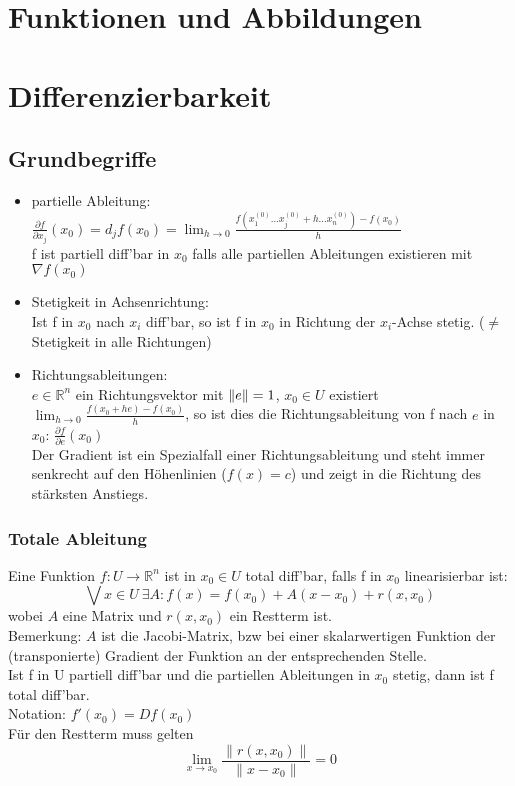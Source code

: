 \section{Funktionen und Abbildungen}


\section{Differenzierbarkeit}
\subsection{Grundbegriffe}
\begin{itemize}
    \item partielle Ableitung:\\ $\frac{\partial f}{\partial x_j}(x_0) = d_j f(x_0) = \lim_{h\to 0}\frac{f(x_1^{(0)} \dots x_j^{(0)}+h \dots x_n^{(0)})-f(x_0)}{h}$\\
    f ist partiell diff'bar in $x_0$ falls alle partiellen Ableitungen existieren mit $\nabla f(x_0)$
    \item Stetigkeit in Achsenrichtung: \\
    Ist f in $x_0$ nach $x_i$ diff'bar, so ist f in $x_0$ in Richtung der $x_i$-Achse stetig. ($\neq$ Stetigkeit in alle Richtungen)
    \item Richtungsableitungen:\\
    $e \in \mathbb{R}^n$ ein Richtungsvektor mit $\left\lVert e\right\rVert=1$, $x_0 \in U$ existiert \\
    $\lim_{h\to 0}\frac{f(x_0 + he)-f(x_0)}{h}$, so ist dies die Richtungsableitung von f nach $e$ in $x_0$: $\frac{\partial f}{\partial e}(x_0)$\\
    Der Gradient ist ein Spezialfall einer Richtungsableitung und steht immer senkrecht auf den Höhenlinien ($f(x) = c$) und zeigt in die Richtung des stärksten Anstiegs.
\end{itemize}
\subsubsection{Totale Ableitung}
Eine Funktion $f: U\to \mathbb{R}^n$ ist in $x_0 \in U$ total diff'bar, falls f in $x_0$ linearisierbar ist: \\
\begin{equation}
    \bigvee x \in U \  \exists A: f(x) = f(x_0) + A(x-x_0) + r(x,x_0)
\end{equation}
wobei $A$ eine Matrix und $r(x,x_0)$ ein Restterm ist.\\
Bemerkung: $A$ ist die Jacobi-Matrix, bzw bei einer skalarwertigen Funktion der (transponierte) Gradient der Funktion an der entsprechenden Stelle.\\
Ist f in U partiell diff'bar und die partiellen Ableitungen in $x_0$ stetig, dann ist f total diff'bar.\\
Notation: $f'(x_0) = Df(x_0)$\\
Für den Restterm muss gelten 
\begin{equation}
    \lim_{x\to x_0}\frac{\|r(x,x_0)\|}{\|x-x_0\|} = 0
\end{equation}

